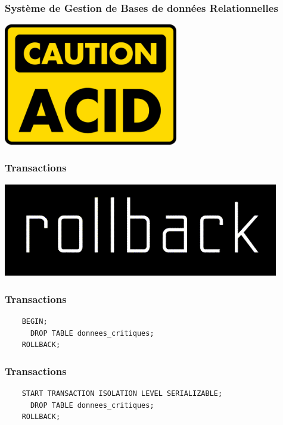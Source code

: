 \documentclass{beamer}
\begin{document}
\begin{frame}
  \frametitle{Système de Gestion de Bases de données Relationnelles}

  \begin{center}
    \includegraphics[height=2.1in]{caution_acid.png}
  \end{center}
\end{frame}

\begin{frame}
  \frametitle{Transactions}

  \begin{center}
    \includegraphics[height=1.6in]{rollback-wordmark.png}
  \end{center}
\end{frame}

\begin{frame}[fragile]
  \frametitle{Transactions}

  \begin{verbatim}
    BEGIN;
      DROP TABLE donnees_critiques;
    ROLLBACK;
  \end{verbatim}
\end{frame}

\begin{frame}[fragile]
  \frametitle{Transactions}

  \begin{verbatim}
    START TRANSACTION ISOLATION LEVEL SERIALIZABLE;
      DROP TABLE donnees_critiques;
    ROLLBACK;
  \end{verbatim}
\end{frame}
\end{document}
